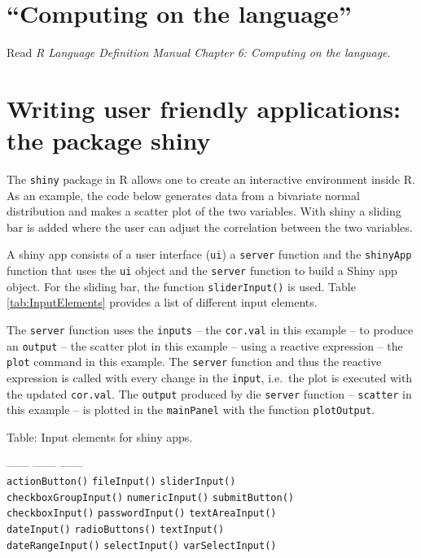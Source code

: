 \documentclass[
]{book}
\begin{document}
\section{``Computing on the language''}\label{computing-on-the-language}

Read \emph{R Language Definition Manual Chapter 6: Computing on the language}.

\section{Writing user friendly applications: the package shiny}\label{writing-user-friendly-applications-the-package-shiny}

The \texttt{shiny} package in R allows one to create an interactive environment inside R. As an example, the code below generates data from a bivariate normal distribution and makes a scatter plot of the two variables. With shiny a sliding bar is added where the user can adjust the correlation between the two variables.

A shiny app consists of a user interface (\texttt{ui}) a \texttt{server} function and the \texttt{shinyApp} function that uses the \texttt{ui} object and the \texttt{server} function to build a Shiny app object. For the sliding bar, the function \texttt{sliderInput()} is used. Table \ref{tab:InputElements} provides a list of different input elements.

The \texttt{server} function uses the \texttt{inputs} -- the \texttt{cor.val} in this example -- to produce an \texttt{output} -- the scatter plot in this example -- using a reactive expression -- the \texttt{plot} command in this example. The \texttt{server} function and thus the reactive expression is called with every change in the \texttt{input}, i.e.~the plot is executed with the updated \texttt{cor.val}. The \texttt{output} produced by die \texttt{server} function -- \texttt{scatter} in this example -- is plotted in the \texttt{mainPanel} with the function \texttt{plotOutput}.

Table: \label{tab:InputElements} Input elements for shiny apps.

------ \textbar{} ------ \textbar{} ------ \textbar{}\\
\texttt{actionButton()} \textbar{} \texttt{fileInput()} \textbar{} \texttt{sliderInput()} \textbar{}\\
\texttt{checkboxGroupInput()} \textbar{} \texttt{numericInput()} \textbar{} \texttt{submitButton()} \textbar{}\\
\texttt{checkboxInput()} \textbar{} \texttt{passwordInput()} \textbar{} \texttt{textAreaInput()} \textbar{}\\
\texttt{dateInput()} \textbar{} \texttt{radioButtons()} \textbar{} \texttt{textInput()} \textbar{}\\
\texttt{dateRangeInput()} \textbar{} \texttt{selectInput()} \textbar{} \texttt{varSelectInput()} \textbar{}
\end{document}
